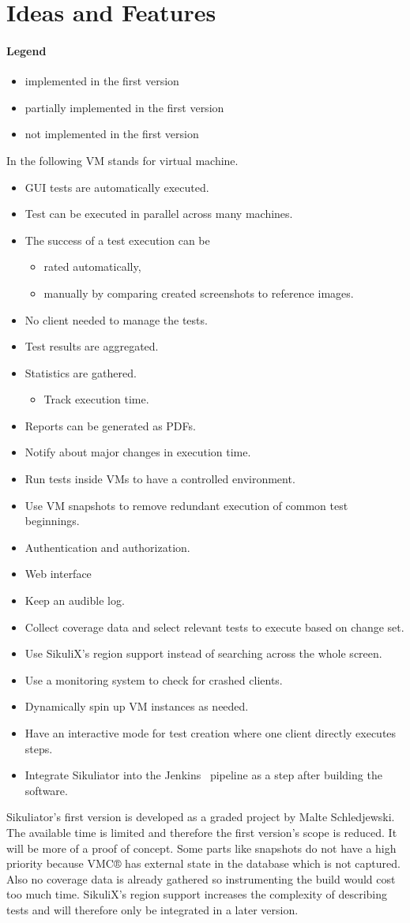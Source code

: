 \documentclass[a4paper,twocolumn]{article}
\newcommand{\VMC}[0]{VMC®}
\newcommand{\Sik}[0]{Sikuliator}
\newcommand{\notImplemented}[0]{\item[$\times$] }
\newcommand{\partiallyImplemented}[0]{\item[$\boxdot$] }
\newcommand{\implemented}[0]{\item[\checkmark] }
\begin{document}
\section{Ideas and Features}
\paragraph{Legend}
\begin{itemize}
	\implemented implemented in the first version
	\partiallyImplemented partially implemented in the first version
	\notImplemented not implemented in the first version
\end{itemize}
	
	In the following VM stands for virtual machine.
\begin{itemize}
	\implemented GUI tests are automatically executed.
	\implemented Test can be executed in parallel across many machines.
	\partiallyImplemented The success of a test execution can be
	\begin{itemize}
		\implemented rated automatically,
		\notImplemented manually by comparing created screenshots to reference images.
	\end{itemize}
	\implemented No client needed to manage the tests.
	\implemented Test results are aggregated.
	\partiallyImplemented Statistics are gathered.
	\begin{itemize}
		\implemented Track execution time.
	\end{itemize}
	\notImplemented Reports can be generated as PDFs.
	\notImplemented Notify about major changes in execution time.
	\implemented Run tests inside VMs to have a controlled environment.
	\notImplemented Use VM snapshots to remove redundant execution of common test beginnings.
	\notImplemented Authentication and authorization.
	\partiallyImplemented Web interface
	\notImplemented Keep an audible log.
	\notImplemented Collect coverage data and select relevant tests to execute based on change set.
	\notImplemented Use SikuliX's region support instead of searching across the whole screen.
	\notImplemented Use a monitoring system to check for crashed clients.
	\notImplemented Dynamically spin up VM instances as needed.
	\notImplemented Have an interactive mode for test creation where one client directly executes steps.
	\notImplemented Integrate \Sik{} into the Jenkins~\cite{Jenkins} pipeline as a step after building the software.
\end{itemize}

\Sik{}'s first version is developed as a graded project by Malte Schledjewski.
The available time is limited and therefore the first version's scope is reduced.
It will be more of a proof of concept.
Some parts like snapshots do not have a high priority because \VMC{} has external state in the database which is not captured. 
Also no coverage data is already gathered so instrumenting the build would cost too much time. 
SikuliX's region support increases the complexity of describing tests and will therefore only be integrated in a later version.
\end{document}
